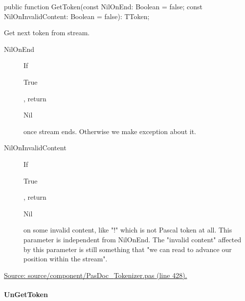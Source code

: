 \documentclass{report}
\newif\ifpdf
\begin{document}
\label{PasDoc_Tokenizer.TTokenizer-GetToken}
\begin{list}{}{
\setlength{\itemindent}{0cm}
\setlength{\listparindent}{0cm}
\setlength{\leftmargin}{\evensidemargin}
\addtolength{\leftmargin}{\tmplength}
\settowidth{\labelsep}{X}
\addtolength{\leftmargin}{\labelsep}
\setlength{\labelwidth}{\tmplength}
}
\item[\textbf{Declaration}\hfill]
\ifpdf
\begin{flushleft}
\fi
\begin{ttfamily}
public function GetToken(const NilOnEnd: Boolean = false; const NilOnInvalidContent: Boolean = false): TToken;\end{ttfamily}

\ifpdf
\end{flushleft}
\fi

\par
\item[\textbf{Description}]
Get next token from stream.



\par
\item[\textbf{Parameters}]
\begin{description}
\item[NilOnEnd] If \begin{ttfamily}True\end{ttfamily}, return \begin{ttfamily}Nil\end{ttfamily} once stream ends. Otherwise we make exception about it.
\item[NilOnInvalidContent] If \begin{ttfamily}True\end{ttfamily}, return \begin{ttfamily}Nil\end{ttfamily} on some invalid content, like "!" which is not Pascal token at all. This parameter is independent from NilOnEnd. The "invalid content" affected by this parameter is still something that "we can read to advance our position within the stream".
\end{description}
\par
\href{https://github.com/pasdoc/pasdoc/blob/master/source/component/PasDoc_Tokenizer.pas#L428}{Source: source/component/PasDoc{\_}Tokenizer.pas (line 428).}

\end{list}
\paragraph*{UnGetToken}\hspace*{\fill}
\end{document}
